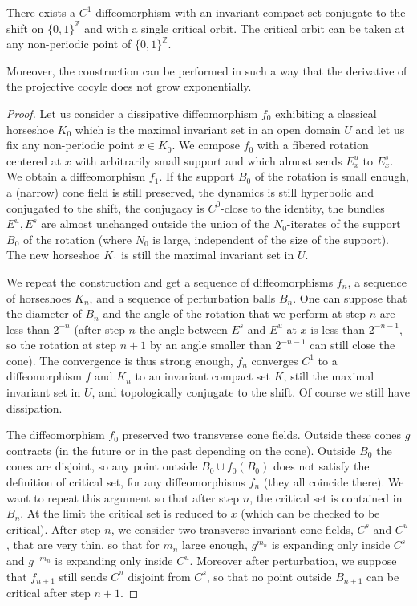 \documentclass[10pt,a4paper]{amsart}
\def\ZZ{{\mathbb Z}}
\begin{document}
\begin{proposition} \label{recurrent critical}

There exists a $C^1$-diffeomorphism  with an invariant compact set
conjugate to the shift on $\{0,1\}^\ZZ$ and with a single critical orbit.
The critical orbit can be taken  at any non-periodic point of $\{0,1\}^\ZZ$.

Moreover, the construction can be performed in such a way that the derivative of the projective cocyle does not grow exponentially. 
\end{proposition}

\begin{proof}
    Let us consider a dissipative diffeomorphism $f_0$ exhibiting a  classical horseshoe $K_0$ 
which is the maximal invariant set in an open domain $U$
and let us fix any non-periodic point $x\in K_0$.
We compose $f_0$ with a fibered rotation centered at $x$ with arbitrarily small
support and which almost sends $E^u_x$ to $E^s_x$.
We obtain a diffeomorphism $f_1$.
If the support $B_0$ of the rotation is small enough, a (narrow) cone field is still preserved,
the dynamics is still hyperbolic and conjugated to the shift,
the conjugacy is $C^0$-close to the identity,
the bundles $E^u,E^s$ are almost unchanged outside
the union of the $N_0$-iterates of the support $B_0$ of the rotation (where $N_0$ is large,
independent of the size of the support).
The new horseshoe $K_1$ is still the maximal invariant set in $U$.

We repeat the construction and get a sequence of diffeomorphisms $f_n$,
a sequence of horseshoes $K_n$, and a sequence of perturbation balls $B_n$.
One can suppose that the diameter of $B_n$ and the angle of the rotation that we perform at step $n$
are less than $2^{-n}$ (after step $n$ the angle between $E^s$ and $E^u$
at $x$ is less than $2^{-n-1}$, so the rotation at step $n+1$ by an angle
smaller than $2^{-n-1}$ can still close the cone).
The convergence is thus strong enough, $f_n$ converges $C^1$ to
a diffeomorphism $f$ and $K_n$ to an invariant compact set $K$,
still the maximal invariant set in $U$,
and topologically conjugate to the shift.
Of course we still have dissipation.

The diffeomorphism $f_0$ preserved two transverse cone fields.
Outside these cones $g$ contracts (in the future or in the past depending on the cone).
Outside $B_0$ the cones are disjoint, so any point outside $B_0\cup f_0(B_0)$
does not satisfy the definition of critical set, for any diffeomorphisms $f_n$
(they all coincide there).
We want to repeat this argument so that after step $n$,
the critical set is contained in $B_n$. At the limit the critical set is reduced
to $x$ (which can be checked to be critical).
After step $n$, we consider two transverse invariant cone fields,  $C^s$ and $C^u$,
that are very thin, so that for $m_n$ large enough,
$g^{m_n}$ is expanding only inside $C^s$ and $g^{-m_n}$ is expanding only inside $C^u$.
Moreover after perturbation, we suppose that $f_{n+1}$ still sends $C^u$
disjoint from $C^s$, so that no point outside $B_{n+1}$ can be critical after step $n+1$.
\end{proof}
\end{document}
